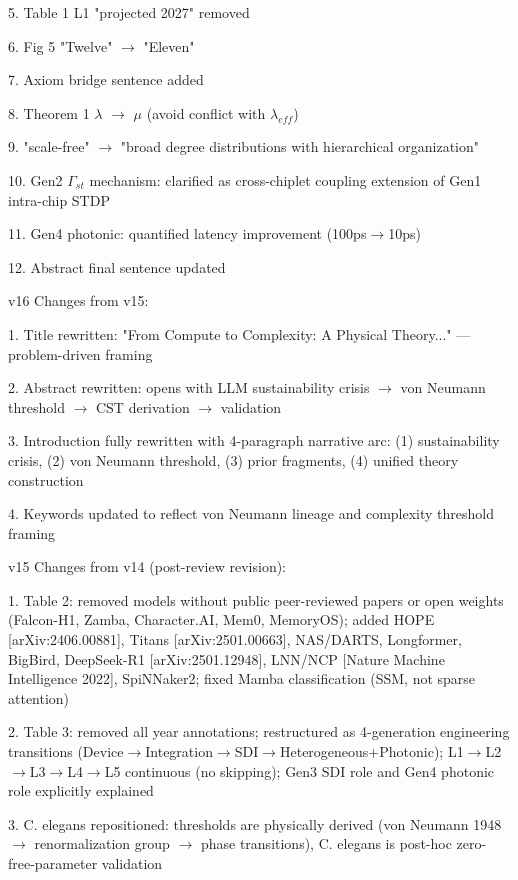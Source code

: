 \documentclass[a4paper,12pt]{article}
\begin{document}
5. Table 1 L1 "projected 2027" removed

6. Fig 5 "Twelve" $\rightarrow$ "Eleven"

7. Axiom bridge sentence added

8. Theorem 1 $\lambda$ $\rightarrow$ $\mu$ (avoid conflict with $\lambda_{eff}$)

9. "scale-free" $\rightarrow$ "broad degree distributions with hierarchical organization"

10. Gen2 $\Gamma_{st}$ mechanism: clarified as cross-chiplet coupling extension of Gen1 intra-chip STDP

11. Gen4 photonic: quantified latency improvement (100ps$\rightarrow$10ps)

12. Abstract final sentence updated

v16 Changes from v15:

1. Title rewritten: "From Compute to Complexity: A Physical Theory..." --- problem-driven framing

2. Abstract rewritten: opens with LLM sustainability crisis $\rightarrow$ von Neumann threshold $\rightarrow$ CST derivation $\rightarrow$ validation

3. Introduction fully rewritten with 4-paragraph narrative arc: (1) sustainability crisis, (2) von Neumann threshold, (3) prior fragments, (4) unified theory construction

4. Keywords updated to reflect von Neumann lineage and complexity threshold framing

v15 Changes from v14 (post-review revision):

1. Table 2: removed models without public peer-reviewed papers or open weights (Falcon-H1, Zamba, Character.AI, Mem0, MemoryOS); added HOPE [arXiv:2406.00881], Titans [arXiv:2501.00663], NAS/DARTS, Longformer, BigBird, DeepSeek-R1 [arXiv:2501.12948], LNN/NCP [Nature Machine Intelligence 2022], SpiNNaker2; fixed Mamba classification (SSM, not sparse attention)

2. Table 3: removed all year annotations; restructured as 4-generation engineering transitions (Device$\rightarrow$Integration$\rightarrow$SDI$\rightarrow$Heterogeneous+Photonic); L1$\rightarrow$L2$\rightarrow$L3$\rightarrow$L4$\rightarrow$L5 continuous (no skipping); Gen3 SDI role and Gen4 photonic role explicitly explained

3. C. elegans repositioned: thresholds are physically derived (von Neumann 1948 $\rightarrow$ renormalization group $\rightarrow$ phase transitions), C. elegans is post-hoc zero-free-parameter validation
\end{document}

